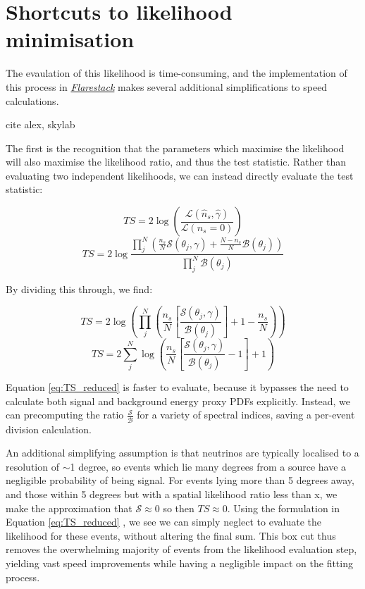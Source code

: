 \section{Shortcuts to likelihood minimisation}
The evaulation of this likelihood is time-consuming, and the implementation of this process in \emph{\href{https://github.com/IceCubeOpenSource/flarestack}{Flarestack}} makes several additional simplifications to speed calculations. 

cite alex, skylab

The first is the recognition that the parameters which maximise the likelihood will also maximise the likelihood ratio, and thus the test statistic. Rather than evaluating two independent likelihoods, we can instead directly evaluate the test statistic:

\begin{equation}
	TS = 2 \log \left( \frac{ \mathcal{L}(\hat{n}_{s}, \hat{\gamma}) }{\mathcal{L}(n_{s} = 0)} \right)
\end{equation}
\begin{equation}
TS = 2 \log  \frac{\prod_{j}^{N} \left(\frac{n_{s}}{N} \mathcal{S}(\theta_{j}, \gamma) + \frac{N - n_{s}}{N} \mathcal{B}(\theta_{j})  \right)}{\prod_{j}^{N}\mathcal{B}(\theta_{j})}
\end{equation}

By dividing this through, we find: 

\begin{equation}
	TS =  2 \log \left(  \prod_{j}^{N} \left(\frac{n_{s}}{N} \left[\frac{\mathcal{S}(\theta_{j}, \gamma)}{\mathcal{B}(\theta_{j})} \right] + 1 - \frac{n_{s}}{N} \right) \right) 
\end{equation}
\begin{equation}
	TS = 2 \sum_{j}^{N} \log \left(\frac{n_{s}}{N} \left[ \frac{\mathcal{S}(\theta_{j}, \gamma)}{\mathcal{B}(\theta_{j}) } - 1 \right] + 1 \right) 
\label{eq:TS_reduced}
\end{equation}

Equation \ref{eq:TS_reduced}  is faster to evaluate, because it bypasses the need to calculate both signal and background energy proxy PDFs explicitly. Instead, we can precomputing the ratio $\frac{\mathcal{S}}{\mathcal{B}}$ for a variety of spectral indices, saving a per-event division calculation.

An additional simplifying assumption is that neutrinos are typically localised to a resolution of $\sim$1 degree, so events which lie many degrees from a source have a negligible probability of being signal. For events lying more than 5 degrees away, and those within 5 degrees but with a spatial likelihood ratio less than x, we make the approximation that $\mathcal{S} \approx 0$ so then $TS \approx 0$. Using the formulation in Equation \ref{eq:TS_reduced} , we see we can simply neglect to evaluate the likelihood for these events, without altering the final sum. This box cut thus removes the overwhelming majority of events from the likelihood evaluation step, yielding vast speed improvements while having a negligible impact on the fitting process.
